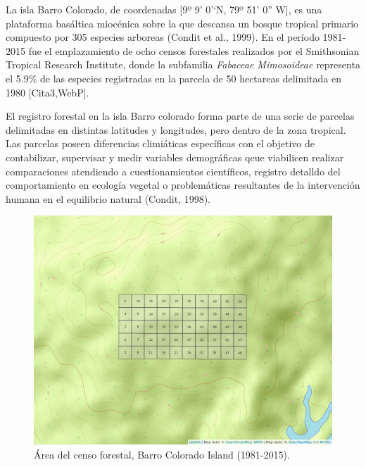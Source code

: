 \documentclass[11pt,]{article}
\begin{document}
La isla Barro Colorado, de coordenadas {[}9º 9' 0'`N, 79º 51' 0'' W{]},
es una plataforma basáltica miocénica sobre la que descansa un bosque
tropical primario compuesto por 305 especies arboreas (Condit et al.,
1999). En el período 1981-2015 fue el emplazamiento de ocho censos
forestales realizados por el Smithsonian Tropical Research Institute,
donde la subfamilia \emph{Fabaceae Mimosoideae} representa el 5.9\% de
las especies registradas en la parcela de 50 hectareas delimitada en
1980 {[}Cita3,WebP{]}.

El registro forestal en la isla Barro colorado forma parte de una serie
de parcelas delimitadas en distintas latitudes y longitudes, pero dentro
de la zona tropical. Las parcelas poseen diferencias climiáticas
específicas con el objetivo de contabilizar, supervisar y medir
variables demográficas qeue viabilicen realizar comparaciones atendiendo
a cuestionamientos científicos, registro detalldo del comportamiento en
ecología vegetal o problemáticas resultantes de la intervención humana
en el equilibrio natural (Condit, 1998).

\begin{figure}
\centering
\includegraphics[width=1.00000\textwidth]{mapa_cuadros.png}
\caption{Área del censo forestal, Barro Colorado Island (1981-2015).}
\end{figure}
\end{document}
